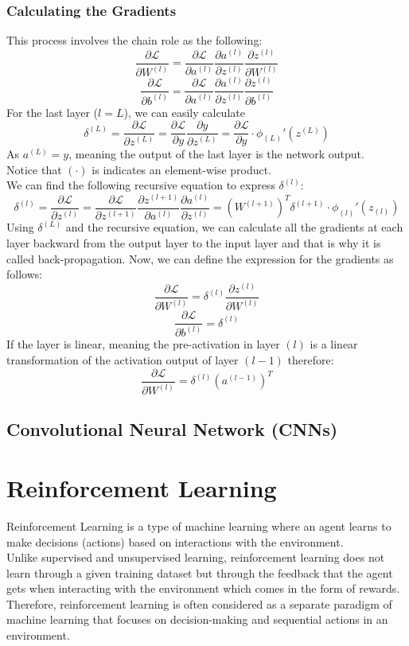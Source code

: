 \documentclass[12pt,a4paper]{report}
\begin{document}
\subsubsection{Calculating the Gradients}
This process involves the chain role as the following: $$\frac{\partial\mathcal{L}}{\partial W^{(l)}}=\frac{\partial\mathcal{L}}{\partial a^{(l)}}\frac{\partial a^{(l)}}{\partial z^{(l)}}\frac{\partial z^{(l)}}{\partial W^{(l)}}$$ $$\frac{\partial\mathcal{L}}{\partial b^{(l)}}=\frac{\partial\mathcal{L}}{\partial a^{(l)}}\frac{\partial a^{(l)}}{\partial z^{(l)}}\frac{\partial z^{(l)}}{\partial b^{(l)}}$$
For the last layer ($l=L$), we can easily calculate $$\delta^{(L)}=\frac{\partial\mathcal{L}}{\partial z^{(L)}}=\frac{\partial\mathcal{L}}{\partial y}\frac{\partial y}{\partial z^{(L)}}=\frac{\partial\mathcal{L}}{\partial y}\cdot\phi_{(L)}'(z^{(L)})$$
As $a^{(L)}=y$, meaning the output of the last layer is the network output.\\
Notice that $(\cdot)$ is indicates an element-wise product.\\
We can find the following recursive equation to express $\delta^{(l)}$: $$\delta^{(l)}=\frac{\partial\mathcal{L}}{\partial z^{(l)}}=\frac{\partial\mathcal{L}}{\partial z^{(l+1)}}\frac{\partial z^{(l+1)}}{\partial a^{(l)}}\frac{\partial a^{(l)}}{\partial z^{(l)}}=(W^{(l+1)})^T\delta^{(l+1)}\cdot\phi_{(l)}'(z_{(l)})$$
Using $\delta^{(L)}$ and the recursive equation, we can calculate all the gradients at each layer backward from the output layer to the input layer and that is why it is called back-propagation. Now, we can define the expression for the gradients as follows: $$\frac{\partial\mathcal{L}}{\partial W^{(l)}}=\delta^{(l)}\frac{\partial z^{(l)}}{\partial W^{(l)}}$$ $$\frac{\partial\mathcal{L}}{\partial b^{(l)}}=\delta^{(l)}$$
If the layer is linear, meaning the pre-activation in layer $(l)$ is a linear transformation of the activation output of layer $(l-1)$ therefore: $$\frac{\partial\mathcal{L}}{\partial W^{(l)}}=\delta^{(l)}(a^{(l-1)})^T$$
\subsection{Convolutional Neural Network (CNNs)}
\section{Reinforcement Learning}
Reinforcement Learning is a type of machine learning where an agent learns to make decisions (actions) based on interactions with the environment.\\
Unlike supervised and unsupervised learning, reinforcement learning does not learn through a given training dataset but through the feedback that the agent gets when interacting with the environment which comes in the form of rewards. Therefore, reinforcement learning is often considered as a separate paradigm of machine learning that focuses on decision-making and sequential actions in an environment.
\end{document}

